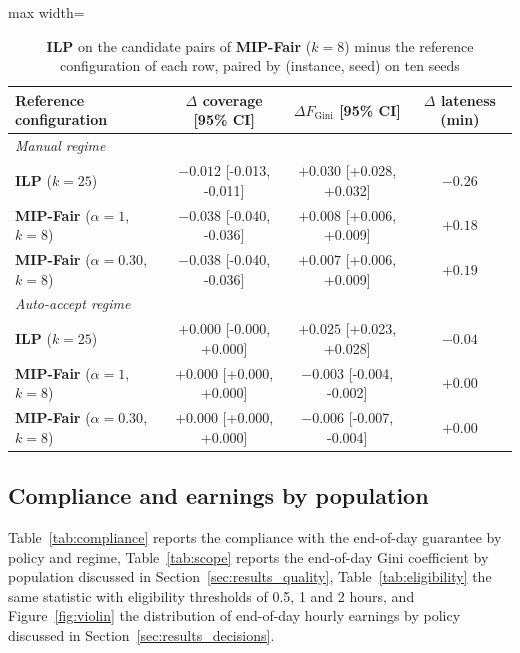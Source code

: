 \documentclass[a4paper,11pt,review,3p,authoryear]{elsarticle}
\newcommand{\FG}{F_{\text{Gini}}}
\begin{document}
\begin{table}[htbp]
\centering
\small
\begin{adjustbox}{max width=\textwidth}
\begin{tabular}{l|c|c|c}
\hline
\textbf{Reference configuration} & $\Delta$ \textbf{coverage [95\% CI]} & $\Delta \FG$ \textbf{[95\% CI]} & $\Delta$ \textbf{lateness (min)} \\
\hline
\multicolumn{4}{l}{\textit{Manual regime}} \\
\textbf{ILP} ($k = 25$) & $-0.012$ [-0.013, -0.011] & $+0.030$ [+0.028, +0.032] & $-0.26$ \\
\textbf{MIP-Fair} ($\alpha = 1$, $k = 8$) & $-0.038$ [-0.040, -0.036] & $+0.008$ [+0.006, +0.009] & $+0.18$ \\
\textbf{MIP-Fair} ($\alpha = 0.30$, $k = 8$) & $-0.038$ [-0.040, -0.036] & $+0.007$ [+0.006, +0.009] & $+0.19$ \\
\hline
\multicolumn{4}{l}{\textit{Auto-accept regime}} \\
\textbf{ILP} ($k = 25$) & $+0.000$ [-0.000, +0.000] & $+0.025$ [+0.023, +0.028] & $-0.04$ \\
\textbf{MIP-Fair} ($\alpha = 1$, $k = 8$) & $+0.000$ [+0.000, +0.000] & $-0.003$ [-0.004, -0.002] & $+0.00$ \\
\textbf{MIP-Fair} ($\alpha = 0.30$, $k = 8$) & $+0.000$ [+0.000, +0.000] & $-0.006$ [-0.007, -0.004] & $+0.00$ \\
\hline
\end{tabular}
\end{adjustbox}
\caption{\textbf{ILP} on the candidate pairs of \textbf{MIP-Fair} ($k = 8$) minus the reference configuration of each row, paired by (instance, seed) on ten seeds}
\label{tab:review_ilp}
\end{table}

\subsection{Compliance and earnings by population}
\label{sec:App_population}

Table~\ref{tab:compliance} reports the compliance with the end-of-day guarantee by policy and regime, Table~\ref{tab:scope} reports the end-of-day Gini coefficient by population discussed in Section~\ref{sec:results_quality}, Table~\ref{tab:eligibility} the same statistic with eligibility thresholds of 0.5, 1 and 2 hours, and Figure~\ref{fig:violin} the distribution of end-of-day hourly earnings by policy discussed in Section~\ref{sec:results_decisions}.
\end{document}
